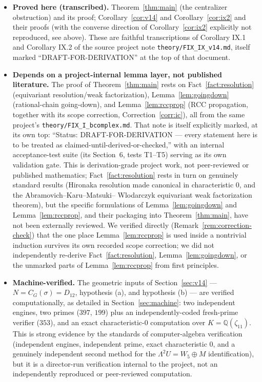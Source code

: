 \documentclass[11pt]{article}
\theoremstyle{plain}
\theoremstyle{definition}
\theoremstyle{remark}
\begin{document}
\begin{itemize}
\item \textbf{Proved here (transcribed).} Theorem~\ref{thm:main} (the
centralizer obstruction) and its proof; Corollary~\ref{cor:v14} and
Corollary~\ref{cor:ix2} and their proofs (with the converse direction of
Corollary~\ref{cor:ix2} explicitly not reproduced, see above). These are
faithful transcriptions of Corollary IX.1 and Corollary IX.2 of the
source project note \texttt{theory/FIX\_IX\_v14.md}, itself marked
``DRAFT-FOR-DERIVATION'' at the top of that document.

\item \textbf{Depends on a project-internal lemma layer, not published
literature.} The proof of Theorem~\ref{thm:main} rests on
Fact~\ref{fact:resolution} (equivariant resolution/weak
factorization), Lemma~\ref{lem:goingdown} (rational-chain going-down),
and Lemma~\ref{lem:rccprop} (RCC propagation, together with its scope
correction, Correction~\ref{corr:ic}), all from the same project's
\texttt{theory/FIX\_I\_bcomplex.md}. That note is itself explicitly
marked, at its own top: ``Status: DRAFT-FOR-DERIVATION --- every
statement here is to be treated as claimed-until-derived-or-checked,''
with an internal acceptance-test suite (its Section~6, tests T1--T5)
serving as its own validation gate. This is derivation-grade project
work, not peer-reviewed or published mathematics; Fact~\ref{fact:resolution}
rests in turn on genuinely standard results (Hironaka resolution made
canonical in characteristic $0$, and the Abramovich--Karu--Matsuki--
Wlodarczyk equivariant weak factorization theorem), but the specific
formulations of Lemma~\ref{lem:goingdown} and Lemma~\ref{lem:rccprop},
and their packaging into Theorem~\ref{thm:main}, have not been
externally reviewed. We verified directly (Remark~\ref{rem:correction-check})
that the one place Lemma~\ref{lem:rccprop} is used inside a nontrivial
induction survives its own recorded scope correction; we did not
independently re-derive Fact~\ref{fact:resolution},
Lemma~\ref{lem:goingdown}, or the unmarked parts of
Lemma~\ref{lem:rccprop} from first principles.

\item \textbf{Machine-verified.} The geometric inputs of
Section~\ref{sec:v14} --- $N=C_G(\sigma)=D_{12}$, hypothesis (a), and
hypothesis (b) --- are verified computationally, as detailed in
Section~\ref{sec:machine}: two independent engines, two primes ($397$,
$199$) plus an independently-coded fresh-prime verifier ($353$), and an
exact characteristic-$0$ computation over $K=\mathbb Q(\zeta_{11})$.
This is strong evidence by the standards of computer-algebra
verification (independent engines, independent prime, exact
characteristic $0$, and a genuinely independent second method for the
$\Lambda^2U=W_5\oplus M$ identification), but it is a director-run
verification internal to the project, not an independently reproduced
or peer-reviewed computation.


\end{itemize}
\end{document}
